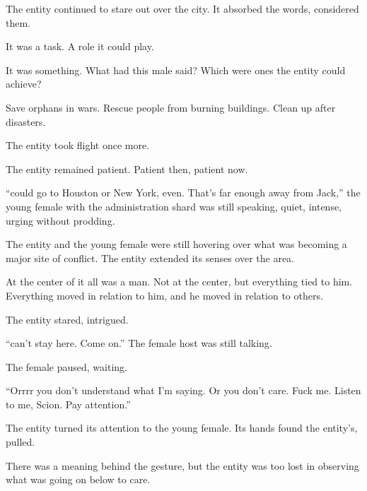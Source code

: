 The entity continued to stare out over the city.  It absorbed the words, considered them.



It was a task.  A role it could play.



It was something.  What had this male said?  Which were ones the entity could achieve?



Save orphans in wars.  Rescue people from burning buildings.  Clean up after disasters.



The entity took flight once more.



\sectionbreak



The entity remained patient.  Patient then, patient now.



``\ldotsYou could go to Houston or New York, even.  That's far enough away from Jack,'' the young female with the administration shard was still speaking, quiet, intense, urging without prodding.



The entity and the young female were still hovering over what was becoming a major site of conflict.  The entity extended its senses over the area.



At the center of it all was a man.  Not at the center, but everything tied to him.  Everything moved in relation to him, and he moved in relation to others.



The entity stared, intrigued.



``\ldotsWe can't stay here.  Come on.''  The female host was still talking.



The female paused, waiting.



``Orrrr you don't understand what I'm saying.  Or you don't care.  Fuck me.  Listen to me, Scion.  Pay attention.''



The entity turned its attention to the young female.  Its hands found the entity's, pulled.



There was a meaning behind the gesture, but the entity was too lost in observing what was going on below to care.



